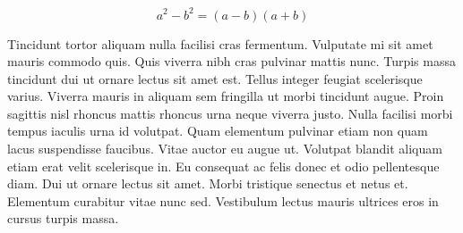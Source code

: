 \documentclass{article}
\begin{document}
    \begin{equation}
    	a^2-b^2=(a-b)(a+b)
    \end{equation}
    
    Tincidunt tortor aliquam nulla facilisi cras fermentum. Vulputate mi sit amet mauris commodo quis. Quis viverra nibh cras pulvinar mattis nunc. Turpis massa tincidunt dui ut ornare lectus sit amet est. Tellus integer feugiat scelerisque varius. Viverra mauris in aliquam sem fringilla ut morbi tincidunt augue. Proin sagittis nisl rhoncus mattis rhoncus urna neque viverra justo. Nulla facilisi morbi tempus iaculis urna id volutpat. Quam elementum pulvinar etiam non quam lacus suspendisse faucibus. Vitae auctor eu augue ut. Volutpat blandit aliquam etiam erat velit scelerisque in. Eu consequat ac felis donec et odio pellentesque diam. Dui ut ornare lectus sit amet. Morbi tristique senectus et netus et. Elementum curabitur vitae nunc sed. Vestibulum lectus mauris ultrices eros in cursus turpis massa.
    
\end{document}
